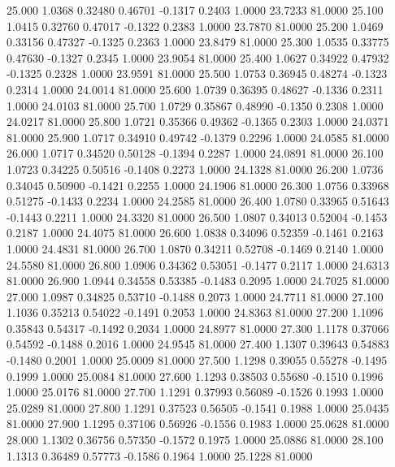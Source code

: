   25.000   1.0368   0.32480   0.46701  -0.1317   0.2403   1.0000  23.7233  81.0000
  25.100   1.0415   0.32760   0.47017  -0.1322   0.2383   1.0000  23.7870  81.0000
  25.200   1.0469   0.33156   0.47327  -0.1325   0.2363   1.0000  23.8479  81.0000
  25.300   1.0535   0.33775   0.47630  -0.1327   0.2345   1.0000  23.9054  81.0000
  25.400   1.0627   0.34922   0.47932  -0.1325   0.2328   1.0000  23.9591  81.0000
  25.500   1.0753   0.36945   0.48274  -0.1323   0.2314   1.0000  24.0014  81.0000
  25.600   1.0739   0.36395   0.48627  -0.1336   0.2311   1.0000  24.0103  81.0000
  25.700   1.0729   0.35867   0.48990  -0.1350   0.2308   1.0000  24.0217  81.0000
  25.800   1.0721   0.35366   0.49362  -0.1365   0.2303   1.0000  24.0371  81.0000
  25.900   1.0717   0.34910   0.49742  -0.1379   0.2296   1.0000  24.0585  81.0000
  26.000   1.0717   0.34520   0.50128  -0.1394   0.2287   1.0000  24.0891  81.0000
  26.100   1.0723   0.34225   0.50516  -0.1408   0.2273   1.0000  24.1328  81.0000
  26.200   1.0736   0.34045   0.50900  -0.1421   0.2255   1.0000  24.1906  81.0000
  26.300   1.0756   0.33968   0.51275  -0.1433   0.2234   1.0000  24.2585  81.0000
  26.400   1.0780   0.33965   0.51643  -0.1443   0.2211   1.0000  24.3320  81.0000
  26.500   1.0807   0.34013   0.52004  -0.1453   0.2187   1.0000  24.4075  81.0000
  26.600   1.0838   0.34096   0.52359  -0.1461   0.2163   1.0000  24.4831  81.0000
  26.700   1.0870   0.34211   0.52708  -0.1469   0.2140   1.0000  24.5580  81.0000
  26.800   1.0906   0.34362   0.53051  -0.1477   0.2117   1.0000  24.6313  81.0000
  26.900   1.0944   0.34558   0.53385  -0.1483   0.2095   1.0000  24.7025  81.0000
  27.000   1.0987   0.34825   0.53710  -0.1488   0.2073   1.0000  24.7711  81.0000
  27.100   1.1036   0.35213   0.54022  -0.1491   0.2053   1.0000  24.8363  81.0000
  27.200   1.1096   0.35843   0.54317  -0.1492   0.2034   1.0000  24.8977  81.0000
  27.300   1.1178   0.37066   0.54592  -0.1488   0.2016   1.0000  24.9545  81.0000
  27.400   1.1307   0.39643   0.54883  -0.1480   0.2001   1.0000  25.0009  81.0000
  27.500   1.1298   0.39055   0.55278  -0.1495   0.1999   1.0000  25.0084  81.0000
  27.600   1.1293   0.38503   0.55680  -0.1510   0.1996   1.0000  25.0176  81.0000
  27.700   1.1291   0.37993   0.56089  -0.1526   0.1993   1.0000  25.0289  81.0000
  27.800   1.1291   0.37523   0.56505  -0.1541   0.1988   1.0000  25.0435  81.0000
  27.900   1.1295   0.37106   0.56926  -0.1556   0.1983   1.0000  25.0628  81.0000
  28.000   1.1302   0.36756   0.57350  -0.1572   0.1975   1.0000  25.0886  81.0000
  28.100   1.1313   0.36489   0.57773  -0.1586   0.1964   1.0000  25.1228  81.0000
